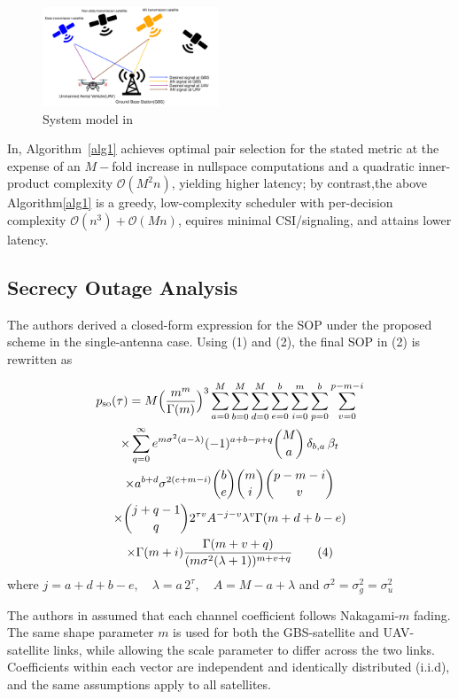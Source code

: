 \documentclass[conference]{IEEEtran}
\begin{document}
\begin{figure}
  \centering
  \includegraphics[width=0.47\textwidth]{System_model.png}
  \caption{System model in \cite{YLee:25}}
  \label{fig1}
\end{figure}
In\cite{YLee:25}, Algorithm~\ref{alg1} achieves optimal pair selection for the stated metric at the expense of an $M-$fold increase in nullspace computations and a quadratic inner-product complexity $\mathcal{O}(M^2 n)$, yielding higher latency; by contrast,the above Algorithm\ref{alg1} is a greedy, low-complexity scheduler with per-decision complexity $\mathcal{O}(n^{3})+\mathcal{O}(Mn)$, equires minimal CSI/signaling, and attains lower latency.
\subsection{Secrecy Outage Analysis} \label{sec3.3}
The authors derived a closed-form expression for the SOP under the proposed scheme in the single-antenna case. Using (1) and (2), the final SOP in (2) is rewritten as

\begin{multline}
p_{\mathrm{so}}(\tau)
= M\Bigl(\frac{m^{m}}{\Gamma(m)}\Bigr)^{3}
\sum_{a=0}^{M}\sum_{b=0}^{M}\sum_{d=0}^{M}\sum_{e=0}^{b}
\sum_{i=0}^{m}\sum_{p=0}^{b}\sum_{v=0}^{p-m-i}\\
\times \sum_{q=0}^{\infty}
e^{m\sigma^{2}(a-\lambda)}(-1)^{a+b-p+q}\binom{M}{a}\,\delta_{b,a}\,\beta_t\\
\times {a}^{b+d}\sigma^{2(e+m-i)}
\binom{b}{e}\binom{m}{i}\binom{p-m-i}{v}\\
\times\binom{j+q-1}{q}2^{\tau v} A^{-j-v}\lambda^{v}
\Gamma(m+d+b-e)\\
\times\Gamma(m+i)\frac{\Gamma(m+v+q)}{(m\sigma^{2}(\lambda+1))^{m+v+q}} 
\tag{4}
\end{multline}
where \(j=a+d+b-e,\quad\lambda = a\,2^{\tau},\quad
A=M-a+\lambda\) and ${\sigma^{2}}={\sigma_g^{2}}={\sigma_u^{2}}$ 

The authors in \cite{YLee:25} assumed that each channel coefficient follows Nakagami-$m$ fading. The same shape parameter $m$ is used for both the GBS-satellite and UAV-satellite links, while allowing the scale parameter to differ across the two links. Coefficients within each vector are independent and identically distributed (i.i.d), and the same assumptions apply to all satellites.
\end{document}
